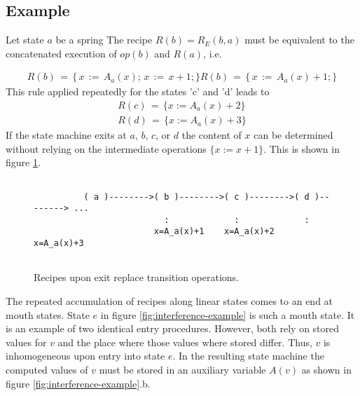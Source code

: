\documentclass[12pt,a4paper]{scrartcl}
\begin{document}
\subsection{Example}
Let state $a$ be a spring 
The recipe $R(b)=R_E(b,a)$ must be equivalent to the concatenated execution of $op(b)$
and $R(a)$, i.e.

\begin{eqnarray}
    R(b)\,=\,\{\,x\,:=\,A_a(x);\,x\,:=\,x + 1;\} 
    R(b)\,=\,\{\,x\,:=\,A_a(x) + 1; \}                                 
\end{eqnarray}
This rule applied repeatedly for the states 'c' and 'd' leads to
\begin{eqnarray}
    R(c) \,= \,\{ x := A_a(x) + 2 \} \\
    R(d) \,= \,\{ x := A_a(x) + 3 \}                                 
\end{eqnarray}
If the state machine exits at $a$, $b$, $c$, or $d$ the content of $x$ can be
determined without relying on the intermediate operations $\{ x:=x+1 \}$. This
is shown in figure \ref{fig:exit-by-recipe}.
\begin{figure}[htbp] \leavevmode \label{fig:exit-by-recipe}
\begin{verbatim}

          ( a )-------->( b )-------->( c )-------->( d )--------> ...
                          :             :             :
                        x=A_a(x)+1    x=A_a(x)+2    x=A_a(x)+3


\end{verbatim}
\caption{Recipes upon exit replace transition operations.}
\end{figure}
The repeated accumulation of recipes along linear states comes to an end at
mouth states. State $e$ in figure \ref{fig:interference-example} is such 
a mouth state. It is an example of two identical entry procedures. However,
both rely on stored values for $v$ and the place where those values 
where stored differ. Thus, $v$ is inhomogeneous upon entry into state $e$.
In the resulting state machine the computed values of $v$ must be stored
in an auxiliary variable $A(v)$ as shown in figure \ref{fig:interference-example}.b.
\end{document}
